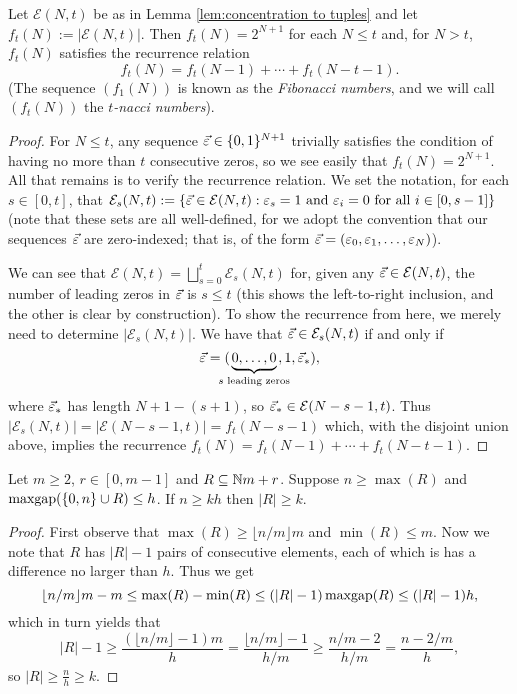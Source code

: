\begin{prop} \label{lem:nacci numbers}
Let $\mathcal{E}(N,t)$ be as in Lemma \ref{lem:concentration to tuples} and let $f_t(N):= |\mathcal{E}(N,t)|$.
Then $f_t(N) = 2^{N+1}$ for each $N\le t$ and, for $N> t$, $f_t(N)$ satisfies the recurrence relation
\[ f_t(N) = f_t(N-1) + \cdots + f_t(N-t-1). \]
(The sequence $(f_1(N))$ is known as the \textit{Fibonacci numbers}, and we will call $(f_t(N))$ the \textit{$t$-nacci numbers}).
\end{prop}
\begin{proof}
For $N\le t$, any sequence $\vec{\varepsilon}\in \{0,1\}^{N+1}$ trivially satisfies the condition of having no more than $t$ consecutive zeros, so we see easily that $f_t(N) = 2^{N+1}$.  
All that remains is to verify the recurrence relation.  
We set the notation, for each $s \in [0,t]$, that $\mathcal{E}_s(N,t) := \{\vec{\varepsilon}\in \mathcal{E}(N,t): \varepsilon_s = 1 \textrm{ and } \varepsilon_i = 0 \textrm{ for all $i\in [0,s-1]$} \}$ (note that these sets are all well-defined, for we adopt the convention that our sequences $\vec{\varepsilon}$ are zero-indexed; that is, of the form $\vec{\varepsilon} = (\varepsilon_0,\varepsilon_1,\dots, \varepsilon_N)$).

We can see that $\mathcal{E}(N,t) = \bigsqcup_{s=0}^t \mathcal{E}_s(N,t)$ for, given any $\vec{\varepsilon}\in \mathcal{E}(N,t)$, the number of leading zeros in $\vec{\varepsilon}$ is $s\le t$ (this shows the left-to-right inclusion, and the other is clear by construction).
To show the recurrence from here, we merely need to determine $|\mathcal{E}_s(N,t)|$.
We have that $\vec{\varepsilon}\in \mathcal{E}_s(N,t)$ if and only if 
\[\vec{\e} = (\!\!\!\!\!\underbrace{0,\dots,0}_{s \textrm{ leading zeros}}\!\!\!\!\!, 1, \vec{\e}_*),\]
 where $\vec{\varepsilon}_*$ has length $N+1 - (s+1)$, so $\vec{\varepsilon}_*\in \mathcal{E}(N-s-1,t)$.
 Thus $|\mathcal{E}_s(N,t)| = |\mathcal{E}(N-s-1,t)|=f_t(N-s-1)$ which, with the disjoint union above, implies the recurrence $f_t(N) = f_t(N-1) + \cdots + f_t(N-t-1)$.
\end{proof}

\begin{lemma}
	Let $m\ge 2$, $r\in[0,m-1]$ and $R\subseteq \mathbb{N} m + r$.
	Suppose $n \ge \max(R)$ and $\operatorname{maxgap}(\{0,n\}\cup R) \le h$.
	If $n \ge kh$ then $|R| \ge k$.
\end{lemma}

\begin{proof}
First observe that $\max(R) \ge \lfloor n/m \rfloor m$ and $\min(R) \le m$.
Now we note that $R$ has $|R|-1$ pairs of consecutive elements, each of which is has a difference no larger than $h$.
Thus we get
\[ \lfloor n/m \rfloor m - m \le \max(R) - \min(R) \le (|R|-1)\operatorname{maxgap}(R) \le (|R|-1)h, \]
which in turn yields that 
\[|R|-1 \ge \frac{(\lfloor n/m \rfloor -1)m}{h} = \frac{\lfloor n/m \rfloor -1}{h/m} \ge \frac{n/m-2}{h/m} = \frac{n-2/m}{h},\]
so $|R| \ge \frac{n}{h} \ge k$.
\end{proof}


